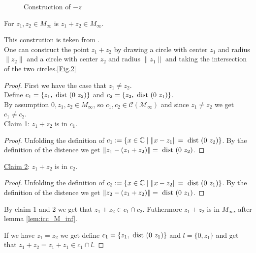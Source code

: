 \begin{figure}[h!]
    \centering
    \caption{Construction of $-z$}
    \label{Fig.1}
\end{figure}

\begin{lemma}
    \label{lem:construction_add}
    \leanok
    For $z_1, z_2 \in M_{\infty}$ is $z_1 + z_2 \in M_{\infty}$.
\end{lemma}
This constrution is teken from \cite{JAN_SCHRÖER:2023}.\\
One can construct the point $z_1 + z_2$ by drawing a circle with center $z_1$ and radius $\|z_2\|$ and a circle with center $z_2$ and radius $\|z_1\|$ and taking the intersection of the two circles.\ref{Fig.2}
\begin{proof}
    First we have the case that $z_1 \ne z_2$.\\
    Define $c_1 = \{z_1,\text{ dist } (0\ z_2)\}$ and $c_2 = \{z_2,\dist (0\ z_1)\}$.\\
    By assumption $0, z_1, z_2 \in M_{\infty}$, so $c_1, c_2 \in \mathcal{C(M_{\infty})}$ and since $z_1 \ne z_2$ we get $c_1 \ne c_2$.\\
    \underline{Claim 1}: $z_1 + z_2$ is in $c_1$.
    \begin{proof}
        Unfolding the definition of $c_1:=\{x\in\mathbb{C} \mid\|x-z_1\|=\dist (0\ z_2)\}$.
        By the definition of the distence we get $\|z_1-(z_1+z_2)\| = \text{ dist } (0\ z_2)$.
    \end{proof}
    \underline{Claim 2}: $z_1 + z_2$ is in $c_2$.
    \begin{proof}
        Unfolding the definition of $c_2:=\{x\in\mathbb{C} \mid\|x-z_2\|=\dist (0\ z_1)\}$.
        By the definition of the distence we get $\|z_2-(z_1+z_2)\| = \text{ dist } (0\ z_1)$.
    \end{proof}
    By claim 1 and 2 we get that $z_1 + z_2 \in c_1 \cap c_2$. Futhermore  $z_1 + z_2 $ is in $M_{\infty}$, after lemma \ref{lem:icc_M_inf}.
    
    If we have $z_1 = z_2$ we get define $c_1 = \{z_1,\dist (0\ z_1)\}$ and $l = \{0,z_1\}$ and get that $z_1 + z_2 = z_1 + z_1 \in c_1 \cap l$.

\end{proof}
